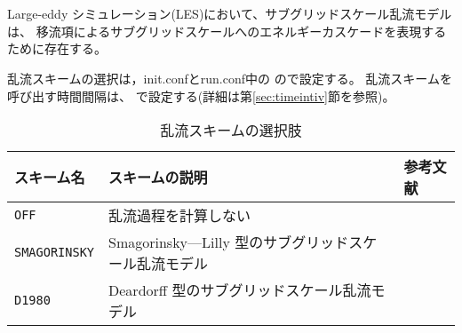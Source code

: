 \section{\SubsecTurbulenceSetting} \label{sec:basic_usel_turbulence}

Large-eddy シミュレーション(LES)において、サブグリッドスケール乱流モデルは、
移流項によるサブグリッドスケールへのエネルギーカスケードを表現するために存在する。

乱流スキームの選択は，init.confとrun.conf中の
ので設定する。
乱流スキームを呼び出す時間間隔は、
で設定する(詳細は第\ref{sec:timeintiv}節を参照)。

\begin{table}[h]
\begin{center}
  \caption{乱流スキームの選択肢}
  \label{tab:nml_atm_tb}
  \begin{tabularx}{150mm}{lXX} \hline
    \rowcolor[gray]{0.9}  スキーム名 & スキームの説明 & 参考文献\\ \hline
      \verb|OFF|          & 乱流過程を計算しない &  \\
      \verb|SMAGORINSKY|  & Smagorinsky—Lilly 型のサブグリッドスケール乱流モデル & \citet{smagorinsky_1963,lilly_1962,Brown_etal_1994,Scotti_1993} \\
      \verb|D1980|        & Deardorff 型のサブグリッドスケール乱流モデル & \citet{Deardorff_1980} \\
    \hline
  \end{tabularx}
\end{center}
\end{table}

